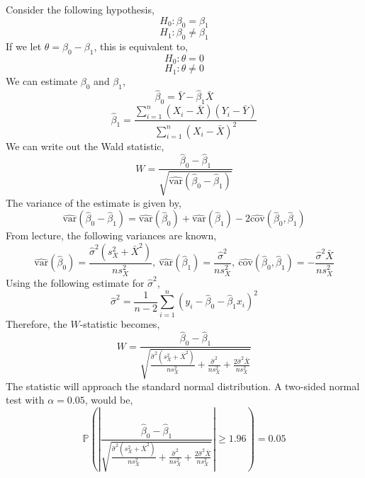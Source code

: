 \documentclass[12pt,twoside]{article}
\begin{document}
\begin{problems}
\begin{problemparts}
\end{problemparts}

\newpage

\problem  %

Consider the following hypothesis,
$$ H_0 : \beta_0 = \beta_1 $$
$$ H_1 : \beta_0 \neq \beta_1 $$
If we let $\theta = \beta_0 - \beta_1$, this is equivalent to,
$$ H_0 : \theta = 0 $$
$$ H_1 : \theta \neq 0 $$
We can estimate $\beta_0$ and $\beta_1$,
$$ \hat{\beta}_0 = \bar{Y} - \hat{\beta}_1 \bar{X} $$
$$ \hat{\beta}_1 = \frac{\sum_{i = 1}^n (X_i - \bar{X})(Y_i -
\bar{Y})}{\sum_{i = 1}^n (X_i - \bar{X})^2} $$
We can write out the Wald statistic,
$$ W = \frac{\hat{\beta}_0 -
\hat{\beta}_1}{\sqrt{\hat{\mathrm{var}}(\hat{\beta}_0 - \hat{\beta}_1)}} $$
The variance of the estimate is given by,
$$ \hat{\mathrm{var}}(\hat{\beta}_0 - \hat{\beta}_1) =
\hat{\mathrm{var}}(\hat{\beta}_0) + \hat{\mathrm{var}}(\hat{\beta}_1) - 2
\hat{\mathrm{cov}}(\hat{\beta}_0, \hat{\beta}_1) $$
From lecture, the following variances are known,
$$ \hat{\mathrm{var}}(\hat{\beta}_0) = \frac{\hat{\sigma}^2(s_X^2 +
\bar{X}^2)}{n s_X^2},\ \hat{\mathrm{var}}(\hat{\beta}_1) =
\frac{\hat{\sigma}^2}{n s_X^2},\ \hat{\mathrm{cov}}(\hat{\beta}_0,
\hat{\beta}_1) = - \frac{\hat{\sigma}^2 \bar{X}}{n s_X^2} $$
Using the following estimate for $\hat{\sigma}^2$,
$$ \hat{\sigma}^2 = \frac{1}{n - 2} \sum_{i = 1}^n (y_i - \hat{\beta}_0 -
\hat{\beta}_1 x_i)^2 $$
Therefore, the $W$-statistic becomes,
$$ W = \frac{\hat{\beta}_0 - \hat{\beta}_1}{\sqrt{\frac{\hat{\sigma}^2(s_X^2
+ \bar{X}^2)}{n s_X^2} + \frac{\hat{\sigma}^2}{n s_X^2} + \frac{2
\hat{\sigma}^2 \bar{X}}{n s_X^2}}} $$
The statistic will approach the standard normal distribution. A two-sided
normal test with $\alpha = 0.05$, would be,
$$ \boxed{\mathbb{P}\left(\left|\frac{\hat{\beta}_0 -
\hat{\beta}_1}{\sqrt{\frac{\hat{\sigma}^2(s_X^2 + \bar{X}^2)}{n s_X^2} +
\frac{\hat{\sigma}^2}{n s_X^2} + \frac{2 \hat{\sigma}^2 \bar{X}}{n
s_X^2}}}\right| \geq 1.96\right) = 0.05} $$

\end{problems}
\end{document}
